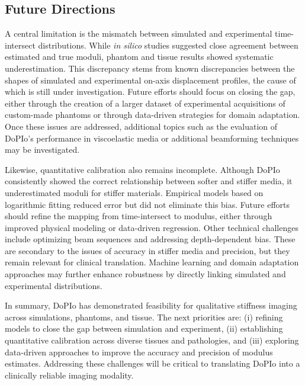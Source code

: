 \subsection{Future Directions}

A central limitation is the mismatch between simulated and experimental time-intersect distributions. While \emph{in silico} studies suggested close agreement between estimated and true moduli, phantom and tissue results showed systematic underestimation. This discrepancy stems from known discrepancies between the shapes of simulated and experimental on-axis displacement profiles, the cause of which is still under investigation. Future efforts should focus on closing the gap, either through the creation of a larger dataset of experimental acquisitions of custom-made phantoms or through data-driven strategies for domain adaptation. Once these issues are addressed, additional topics such as the evaluation of DoPIo's performance in viscoelastic media or additional beamforming techniques may be investigated.

%

Likewise, quantitative calibration also remains incomplete. Although DoPIo consistently showed the correct relationship between softer and stiffer media, it underestimated moduli for stiffer materials. Empirical models based on logarithmic fitting reduced error but did not eliminate this bias. Future efforts should refine the mapping from time-intersect to modulus, either through improved physical modeling or data-driven regression. Other technical challenges include optimizing beam sequences and addressing depth-dependent bias. These are secondary to the issues of accuracy in stiffer media and precision, but they remain relevant for clinical translation. Machine learning and domain adaptation approaches may further enhance robustness by directly linking simulated and experimental distributions.

In summary, DoPIo has demonstrated feasibility for qualitative stiffness imaging across simulations, phantoms, and tissue. The next priorities are: (i) refining models to close the gap between simulation and experiment, (ii) establishing quantitative calibration across diverse tissues and pathologies, and (iii) exploring data-driven approaches to improve the accuracy and precision of modulus estimates. Addressing these challenges will be critical to translating DoPIo into a clinically reliable imaging modality.

